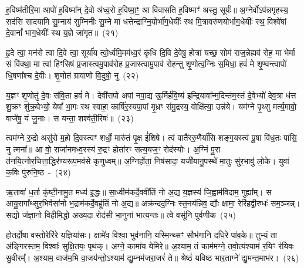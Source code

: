 {\anuvakamend[{अ॒सि॒ षड्विꣳ॑शतिश्च}]}%

ह॒विष्म॑तीरि॒मा आपो॑ ह॒विष्मा᳚न् दे॒वो अ॑ध्व॒रो ह॒विष्मा॒ꣳ॒ आ वि॑वासति ह॒विष्माꣳ॑ अस्तु॒ सूर्यः॑॥ अ॒ग्नेर्वो\-ऽप॑न्नगृहस्य॒ सद॑सि सादयामि सु॒म्नाय॑ सुम्निनीः सु॒म्ने मा॑ धत्तेन्द्राग्नि॒योर्भा॑ग॒धेयीः᳚ स्थ मि॒त्रावरु॑णयोर्भाग॒धेयीः᳚ स्थ॒ विश्वे॑षां दे॒वानां᳚ भाग॒धेयीः᳚ स्थ य॒ज्ञे जा॑गृत॥~(२१)

{\anuvakamend[{ह॒विष्म॑ती॒श्चतु॑स्रिꣳशत्}]}%

हृ॒दे त्वा॒ मन॑से त्वा दि॒वे त्वा॒ सूर्या॑य त्वो॒र्ध्वमि॒मम॑ध्व॒रं कृ॑धि दि॒वि दे॒वेषु॒ होत्रा॑ यच्छ॒ सोम॑ राज॒न्नेह्यव॑ रोह॒ मा भेर्मा सं वि॑क्था॒ मा त्वा॑ हिꣳसिषं प्र॒जास्त्वमु॒पाव॑रोह प्र॒जास्त्वामु॒पाव॑ रोहन्तु शृ॒णोत्व॒ग्निः स॒मिधा॒ हवं॑ मे शृ॒ण्वन्त्वापो॑ धि॒षणा᳚श्च दे॒वीः। शृ॒णोत॑ ग्रावाणो वि॒दुषो॒ नु~(२२)

य॒ज्ञꣳ शृ॒णोतु॑ दे॒वः स॑वि॒ता हवं॑ मे। देवी॑रापो अपां नपा॒द्य ऊ॒र्मिर्\mbox{}ह॑वि॒ष्य॑ इन्द्रि॒यावा᳚न्म॒दिन्त॑म॒स्तं दे॒वेभ्यो॑ देव॒त्रा ध॑त्त शु॒क्रꣳ शु॑क्र॒पेभ्यो॒ येषां᳚ भा॒गः स्थ स्वाहा॒ कार्\mbox{}षि॑र॒स्यपा॒पां मृ॒ध्रꣳ स॑मु॒द्रस्य॒ वोक्षि॑त्या॒ उन्न॑ये। यम॑ग्ने पृ॒थ्सु मर्त्य॒मावो॒ वाजे॑षु॒ यं जु॒नाः। स यन्ता॒ शश्व॑ती॒रिषः॑॥~(२३)

{\anuvakamend[{नु स॒प्तच॑त्वारिꣳशच्च}]}%

त्वम॑ग्ने रु॒द्रो असु॑रो म॒हो दि॒वस्त्वꣳ शर्धो॒ मारु॑तं पृ॒क्ष ई॑शिषे। त्वं वातै॑ररु॒णैर्या॑सि शङ्ग॒यस्त्वं पू॒षा वि॑ध॒तः पा॑सि॒ नु त्मना᳚॥ आ वो॒ राजा॑नमध्व॒रस्य॑ रु॒द्रꣳ होता॑रꣳ सत्य॒यज॒ꣳ॒ रोद॑स्योः। अ॒ग्निं पु॒रा त॑नयि॒त्नोर॒चित्ता॒द्धिर॑ण्यरूप॒मव॑से कृणुध्वम्॥ अ॒ग्निर्\mbox{}होता॒ निष॑सादा॒ यजी॑यानु॒पस्थे॑ मा॒तुः सु॑र॒भावु॑ लो॒के। युवा॑ क॒विः पु॑रुनि॒ष्ठ~-~(२४)

ऋ॒तावा॑ ध॒र्ता कृ॑ष्टी॒नामु॒त मध्य॑ इ॒द्धः॥ सा॒ध्वीम॑कर्दे॒ववी॑तिं नो अ॒द्य य॒ज्ञस्य॑ जि॒ह्वाम॑विदाम॒ गुह्या᳚म्। स आयु॒रागा᳚थ्सुर॒\-भिर्वसा॑नो भ॒द्राम॑कर्दे॒वहू॑तिं नो अ॒द्य॥ अक्र॑न्दद॒ग्निः स्त॒नय॑न्निव॒ द्यौः क्षामा॒ रेरि॑हद्वी॒रुधः॑ सम॒ञ्जन्न्। स॒द्यो ज॑ज्ञा॒नो विहीमि॒द्धो अख्य॒दा रोद॑सी भा॒नुना॑ भात्य॒न्तः॥ त्वे वसू॑नि पुर्वणीक~(२५)

होतर्दो॒षा वस्तो॒रेरि॑रे य॒ज्ञिया॑सः। क्षामे॑व॒ विश्वा॒ भुव॑नानि॒ यस्मि॒न्थ्सꣳ सौभ॑गानि दधि॒रे पा॑व॒के॥ तुभ्यं॒ ता अ॑ङ्गिरस्तम॒ विश्वाः᳚ सुक्षि॒तयः॒ पृथ॑क्। अग्ने॒ कामा॑य येमिरे॥ अ॒श्याम॒ तं काम॑मग्ने॒ तवो॒त्य॑श्याम॑ र॒यिꣳ र॑यिवः सु॒वीरम्᳚। अ॒श्याम॒ वाज॑म॒भि वा॒जय॑न्तो॒\-ऽश्याम॑ द्यु॒म्नम॑जरा॒जरं॑ ते॥ श्रेष्ठं॑ यविष्ठ भार॒ताग्ने᳚ द्यु॒मन्त॒माभ॑र।~(२६)

